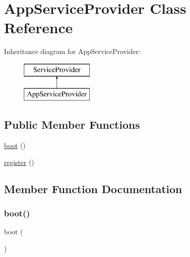 \hypertarget{class_app_1_1_providers_1_1_app_service_provider}{}\section{App\+Service\+Provider Class Reference}
\label{class_app_1_1_providers_1_1_app_service_provider}
Inheritance diagram for App\+Service\+Provider\+:\begin{figure}[H]
\begin{center}
\leavevmode
\includegraphics[height=2.000000cm]{class_app_1_1_providers_1_1_app_service_provider}
\end{center}
\end{figure}
\subsection*{Public Member Functions}
\begin{DoxyCompactItemize}
\item 
\mbox{\hyperlink{class_app_1_1_providers_1_1_app_service_provider_a8814ea4b5beba763c570b4818980814e}{boot}} ()
\item 
\mbox{\hyperlink{class_app_1_1_providers_1_1_app_service_provider_acc294a6cc8e69743746820e3d15e3f78}{register}} ()
\end{DoxyCompactItemize}


\subsection{Member Function Documentation}
\mbox{\label{class_app_1_1_providers_1_1_app_service_provider_a8814ea4b5beba763c570b4818980814e}} 
\subsubsection{\texorpdfstring{boot()}{boot()}}
{\footnotesize\ttfamily boot (\begin{DoxyParamCaption}{ }\end{DoxyParamCaption})}

